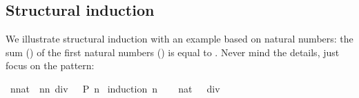 \begin{isabellebody}
\begin{isamarkuptext}
\subsection{Structural induction}

We illustrate structural induction with an example based on natural numbers:
the sum () of the first  natural numbers
() is equal to \mbox{}.
Never mind the details, just focus on the pattern:%
\end{isamarkuptext}%
\isamarkuptrue%
\isamarkupfalse%
\ {}{}{}{}{}{}n{}{}nat{}\ {}\ n{}{}n{}{}{}\ div\ {}{}\ {}\ {}{}P\ n{}{}\isanewline
%
\isadelimproof
%
\endisadelimproof
%
\isatagproof
{}\isamarkupfalse%
\ {}induction\ n{}\isanewline
\ \ \isamarkupfalse%
\ {}{}{}{}{}{}{}{}{}nat{}\ {}\ {}{}{}{}{}{}{}\ div\ {}{}\ \isamarkupfalse%

\end{isabellebody}
